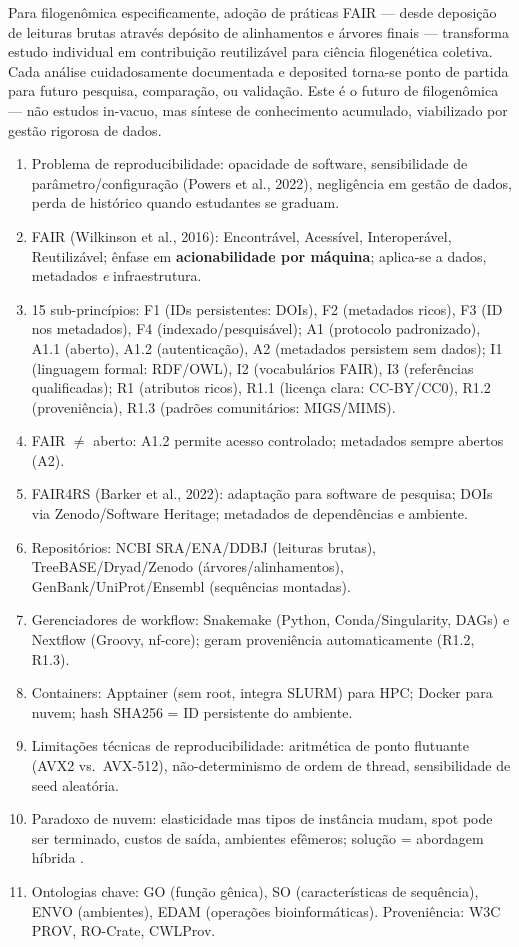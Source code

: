 Para filogenômica especificamente, adoção de práticas FAIR --- desde deposição de leituras brutas através depósito de alinhamentos e árvores finais --- transforma estudo individual em contribuição reutilizável para ciência filogenética coletiva. Cada análise cuidadosamente documentada e deposited torna-se ponto de partida para futuro pesquisa, comparação, ou validação. Este é o futuro de filogenômica --- não estudos in-vacuo, mas síntese de conhecimento acumulado, viabilizado por gestão rigorosa de dados.

\clearpage
\begin{revise}
\begin{enumerate}
    \item Problema de reproducibilidade: opacidade de software, sensibilidade de parâmetro/configuração (Powers et al., 2022), negligência em gestão de dados, perda de histórico quando estudantes se graduam.
    \item FAIR (Wilkinson et al., 2016): Encontrável, Acessível, Interoperável, Reutilizável; ênfase em \textbf{acionabilidade por máquina}; aplica-se a dados, metadados \textit{e} infraestrutura.
    \item 15 sub-princípios: F1 (IDs persistentes: DOIs), F2 (metadados ricos), F3 (ID nos metadados), F4 (indexado/pesquisável); A1 (protocolo padronizado), A1.1 (aberto), A1.2 (autenticação), A2 (metadados persistem sem dados); I1 (linguagem formal: RDF/OWL), I2 (vocabulários FAIR), I3 (referências qualificadas); R1 (atributos ricos), R1.1 (licença clara: CC-BY/CC0), R1.2 (proveniência), R1.3 (padrões comunitários: MIGS/MIMS).
    \item FAIR $\neq$ aberto: A1.2 permite acesso controlado; metadados sempre abertos (A2).
    \item FAIR4RS (Barker et al., 2022): adaptação para software de pesquisa; DOIs via Zenodo/Software Heritage; metadados de dependências e ambiente.
    \item Repositórios: NCBI SRA/ENA/DDBJ (leituras brutas), TreeBASE/Dryad/Zenodo (árvores/alinhamentos), GenBank/UniProt/Ensembl (sequências montadas).
    \item Gerenciadores de workflow: Snakemake (Python, Conda/Singularity, DAGs) e Nextflow (Groovy, nf-core); geram proveniência automaticamente (R1.2, R1.3).
    \item Containers: Apptainer (sem root, integra SLURM) para HPC; Docker para nuvem; hash SHA256 = ID persistente do ambiente.
    \item Limitações técnicas de reproducibilidade: aritmética de ponto flutuante (AVX2 vs.\ AVX-512), não-determinismo de ordem de thread, sensibilidade de seed aleatória.
    \item Paradoxo de nuvem: elasticidade mas tipos de instância mudam, spot pode ser terminado, custos de saída, ambientes efêmeros; solução = abordagem híbrida \parencite{langmead2018}.
    \item Ontologias chave: GO (função gênica), SO (características de sequência), ENVO (ambientes), EDAM (operações bioinformáticas). Proveniência: W3C PROV, RO-Crate, CWLProv.
\end{enumerate}
\end{revise}

\clearpage

\printbibliography[heading=subbibliography,title={Referências}]

